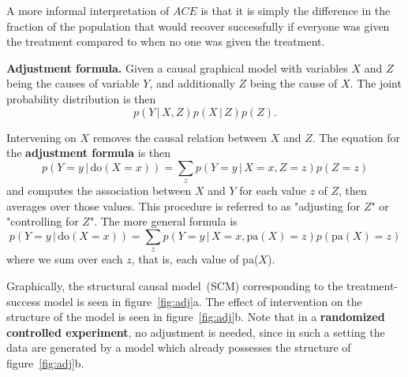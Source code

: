 \documentclass{article}
\newcommand{\giv}{\,|\,}
\begin{document}
\noindent A more informal interpretation of $ACE$ is that it is simply the difference in the fraction of the population that would recover successfully if everyone was given the treatment compared to when no one was given the treatment. 
\\
\begin{theorem}
    \textbf{Adjustment formula.} Given a causal graphical model with variables $X$ and $Z$ being the causes of variable $Y$, and additionally $Z$ being the cause of $X$. The joint probability distribution is then 
    $$
        p(Y \giv X, Z)p(X \giv Z)p(Z) .
    $$
    \begin{center}
    \end{center}
    Intervening on $X$ removes the causal relation between $X$ and $Z$. The equation for the \textbf{adjustment formula} is then
    $$
        p(Y = y \giv \text{do}(X = x)) = \sum_z p(Y=y \giv X=x, Z=z)p(Z=z)
    $$
    and computes the association between $X$ and $Y$ for each value $z$ of $Z$, then averages over those values. This procedure is referred to as "adjusting for $Z$" or "controlling for $Z$". The more general formula is
    $$
        p(Y = y \giv \text{do}(X = x)) = \sum_z p(Y=y \giv X=x, \text{pa}(X)=z)p(\text{pa}(X)=z)
    $$
    where we sum over each $z$, that is, each value of pa($X$). 
\end{theorem}

\noindent Graphically, the structural causal model~(SCM) corresponding to the treatment-success model is seen in figure~\ref{fig:adj}a. The effect of intervention on the structure of the model is seen in figure~\ref{fig:adj}b. Note that in a \textbf{randomized controlled experiment}, no adjustment is needed, since in such a setting the data are generated by a model which already possesses the structure of figure~\ref{fig:adj}b. 
\end{document}
